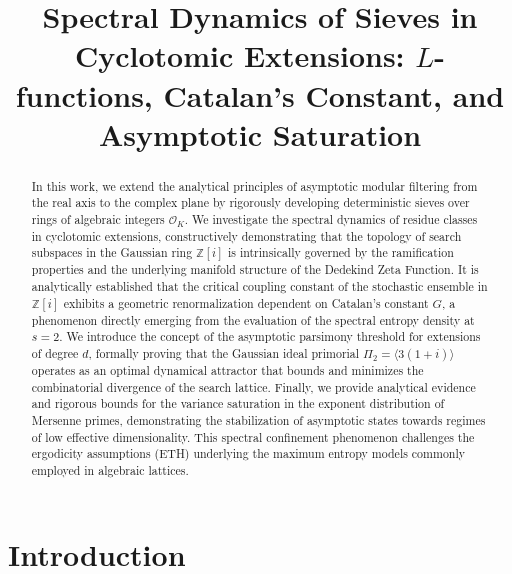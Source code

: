 \documentclass{article}
\title{Spectral Dynamics of Sieves in Cyclotomic Extensions: $L$-functions, Catalan's Constant, and Asymptotic Saturation}
\numberwithin{equation}{section}
\theoremstyle{plain}
\theoremstyle{definition}
\begin{document}
\begin{abstract}
In this work, we extend the analytical principles of asymptotic modular filtering from the real axis to the complex plane by rigorously developing deterministic sieves over rings of algebraic integers $\mathcal{O}_K$. We investigate the spectral dynamics of residue classes in cyclotomic extensions, constructively demonstrating that the topology of search subspaces in the Gaussian ring $\mathbb{Z}[i]$ is intrinsically governed by the ramification properties and the underlying manifold structure of the Dedekind Zeta Function. It is analytically established that the critical coupling constant of the stochastic ensemble in $\mathbb{Z}[i]$ exhibits a geometric renormalization dependent on Catalan's constant $G$, a phenomenon directly emerging from the evaluation of the spectral entropy density at $s=2$. We introduce the concept of the asymptotic parsimony threshold for extensions of degree $d$, formally proving that the Gaussian ideal primorial $\Pi_2 = \langle 3(1+i) \rangle$ operates as an optimal dynamical attractor that bounds and minimizes the combinatorial divergence of the search lattice. Finally, we provide analytical evidence and rigorous bounds for the variance saturation in the exponent distribution of Mersenne primes, demonstrating the stabilization of asymptotic states towards regimes of low effective dimensionality. This spectral confinement phenomenon challenges the ergodicity assumptions (ETH) underlying the maximum entropy models commonly employed in algebraic lattices.
\end{abstract}

\maketitle

\section{Introduction}
\label{sec:intro}
\end{document}
